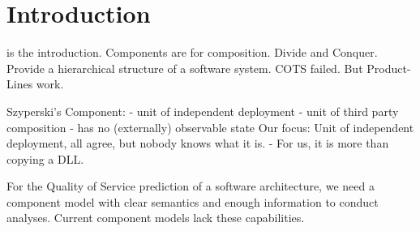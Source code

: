 \section{Introduction}
 is the introduction.
Components are for composition.
Divide and Conquer. Provide a hierarchical structure of a software system.
COTS failed. But Product-Lines work.

Szyperski's Component:
-	unit of independent deployment
-	unit of third party composition
-	has no (externally) observable state
Our focus: Unit of independent deployment, all agree, but nobody knows what it is. - For us, it is more than copying a DLL.

For the Quality of Service prediction of a software architecture, we need a component model with clear semantics and enough information to conduct analyses. Current component models lack these capabilities.

